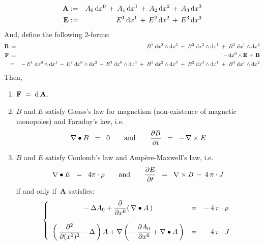 \begin{theorem}
\begin{eqnarray*}
\\
\mathbf{A}
& := &
	A_{0}\,\textnormal{d} x^{0} \,+\, A_{1}\,\textnormal{d} x^{1}  \,+\, A_{2}\,\textnormal{d} x^{2}  \,+\, A_{3}\,\textnormal{d} x^{3}
\\
\mathbf{E}
& := &
	E^{1}\,\textnormal{d} x^{1} \,+\, E^{2}\,\textnormal{d} x^{2} \,+\, E^{3}\,\textnormal{d} x^{3}
\end{eqnarray*}
\vskip 0.3cm
\noindent
And, define the following $2$-forms:
\begin{eqnarray*}
\mathbf{B}
& := &
	B^{1}\;\textnormal{d} x^{2} \wedge \textnormal{d} x^{3}
	\;+\;
	B^{2}\;\textnormal{d} x^{3} \wedge \textnormal{d} x^{1}
	\;+\;
	B^{3}\;\textnormal{d} x^{1} \wedge \textnormal{d} x^{2}
\\
\mathbf{F}
& := &
	- \, \textnormal{d} x^{0} \wedge \mathbf{E} \, + \, \mathbf{B}
\\
& = &
	- \, E^{1}\;\textnormal{d} x^{0} \wedge \textnormal{d} x^{1} \, - \, E^{2}\;\textnormal{d} x^{0} \wedge \textnormal{d} x^{2} \, - \, E^{3}\;\textnormal{d} x^{0} \wedge \textnormal{d} x^{3}
	\;+\;
	B^{1}\;\textnormal{d} x^{2} \wedge \textnormal{d} x^{3}
	\;+\;
	B^{2}\;\textnormal{d} x^{3} \wedge \textnormal{d} x^{1}
	\;+\;
	B^{3}\;\textnormal{d} x^{1} \wedge \textnormal{d} x^{2}
\end{eqnarray*}
Then,
\begin{enumerate}
\item
	$\mathbf{F} \; = \; \textnormal{d}\,\mathbf{A}$.
\item
	$B$ and $E$ satisfy Gauss's law for magnetism (non-existence of magnetic monopoles) and Faraday's law, i.e.
	\begin{equation*}
	\nabla \bullet B \;\; = \;\; 0
	\quad\quad\textnormal{and}\quad\quad
	\dfrac{\partial B}{\partial t} \;\; = \;\; -\,\nabla \times E
	\end{equation*}	
\item	
	$B$ and $E$ satisfy Coulomb's law and Amp\`{e}re-Maxwell's law, i.e.
	\begin{equation*}
	\nabla \bullet E \;\; = \;\; 4 \pi \cdot \rho
	\quad\quad\textnormal{and}\quad\quad
	\dfrac{\partial E}{\partial t} \;\; = \;\; \nabla \times B \,-\, 4\,\pi\cdot J
	\end{equation*}
	if and only if \,$\mathbf{A}$ satisfies:
	\begin{equation*}
	\left\{\begin{array}{ccl}
		-\,\Delta A_{0} + \dfrac{\partial}{\partial x^{0}}\!\left(\,\nabla \bullet A\,\right)
		& = &
			- \, 4\,\pi\cdot\rho
		\\ \\
		\left(\,\dfrac{\partial^{2}}{\partial(x^{0})^{2}} - \Delta\,\right)A
		+
		\nabla\left(\, -\,\dfrac{\partial A_{0}}{\partial x^{0}} + \nabla \bullet A \,\right)
		& = &
			{\color{white}-} \, 4\,\pi \cdot J
		\end{array}\right.
	\end{equation*}
\end{enumerate}
\end{theorem}

